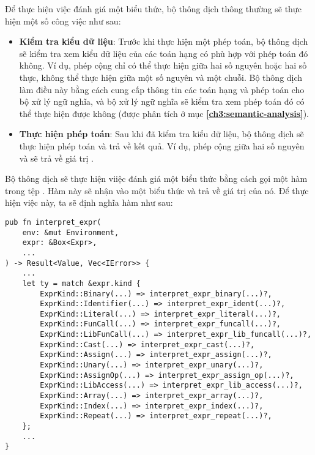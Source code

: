     Để thực hiện việc đánh giá một biểu thức, bộ thông dịch thông thường sẽ thực hiện một số công việc như sau:

\begin{itemize}
    \item \textbf{Kiểm tra kiểu dữ liệu}: Trước khi thực hiện một phép toán, bộ thông dịch sẽ kiểm tra xem kiểu dữ liệu của các toán hạng có phù hợp với phép toán đó không. Ví dụ, phép cộng chỉ có thể thực hiện giữa hai số nguyên hoặc hai số thực, không thể thực hiện giữa một số nguyên và một chuỗi. Bộ thông dịch làm điều này bằng cách cung cấp thông tin các toán hạng và phép toán cho bộ xử lý ngữ nghĩa, và bộ xử lý ngữ nghĩa sẽ kiểm tra xem phép toán đó có thể thực hiện được không (được phân tích ở mục \textbf{\ref{ch3:semantic-analysis}}).
    \item \textbf{Thực hiện phép toán}: Sau khi đã kiểm tra kiểu dữ liệu, bộ thông dịch sẽ thực hiện phép toán và trả về kết quả. Ví dụ, phép cộng giữa hai số nguyên  và  sẽ trả về giá trị .
\end{itemize}

    Bộ thông dịch sẽ thực hiện viiệc đánh giá một biểu thức bằng cách gọi một hàm  trong tệp . Hàm này sẽ nhận vào một biểu thức và trả về giá trị của nó. Để thực hiện việc này, ta sẽ định nghĩa hàm  như sau:

\begin{lstlisting}[]
pub fn interpret_expr(
    env: &mut Environment,
    expr: &Box<Expr>,
    ...
) -> Result<Value, Vec<IError>> {
    ...
    let ty = match &expr.kind {
        ExprKind::Binary(...) => interpret_expr_binary(...)?,
        ExprKind::Identifier(...) => interpret_expr_ident(...)?,
        ExprKind::Literal(...) => interpret_expr_literal(...)?,
        ExprKind::FunCall(...) => interpret_expr_funcall(...)?,
        ExprKind::LibFunCall(...) => interpret_expr_lib_funcall(...)?,
        ExprKind::Cast(...) => interpret_expr_cast(...)?,
        ExprKind::Assign(...) => interpret_expr_assign(...)?,
        ExprKind::Unary(...) => interpret_expr_unary(...)?,
        ExprKind::AssignOp(...) => interpret_expr_assign_op(...)?,
        ExprKind::LibAccess(...) => interpret_expr_lib_access(...)?,
        ExprKind::Array(...) => interpret_expr_array(...)?,
        ExprKind::Index(...) => interpret_expr_index(...)?,
        ExprKind::Repeat(...) => interpret_expr_repeat(...)?,
    };
    ...
}
\end{lstlisting}


